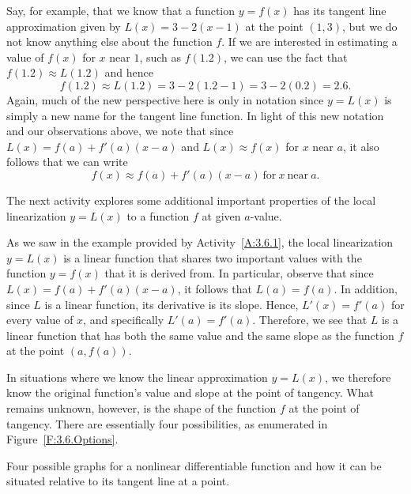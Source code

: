 Say, for example, that we know that a function $y = f(x)$ has its tangent line approximation given by $L(x) = 3 - 2(x-1)$ at the point $(1,3)$, but we do not know anything else about the function $f$.  If we are interested in estimating a value of $f(x)$ for $x$ near $1$, such as $f(1.2)$, we can use the fact that $f(1.2) \approx L(1.2)$ and hence
$$f(1.2) \approx L(1.2) = 3 - 2(1.2-1) = 3 - 2(0.2) = 2.6.$$
Again, much of the new perspective here is only in notation since $y = L(x)$ is simply a new name for the tangent line function.  In light of this new notation and our observations above, we note that since $L(x) = f(a) + f'(a)(x-a)$ and $L(x) \approx f(x)$ for $x$ near $a$, it also follows that we can write
$$f(x) \approx f(a) + f'(a)(x-a) \ \mbox{for} \  x \ \mbox{near} \ a.$$

The next activity explores some additional important properties of the local linearization $y = L(x)$ to a function $f$ at given $a$-value.


As we saw in the example provided by Activity~\ref{A:3.6.1}, the local linearization $y = L(x)$ is a linear function that shares two important values with the function $y = f(x)$ that it is derived from.  In particular, observe that since $L(x) = f(a) + f'(a)(x-a)$, it follows that $L(a) = f(a)$.  In addition, since $L$ is a linear function, its derivative is its slope.  Hence, $L'(x) = f'(a)$ for every value of $x$, and specifically $L'(a) = f'(a)$.  Therefore, we see that $L$ is a linear function that has both the same value and the same slope as the function $f$ at the point $(a,f(a))$.

In situations where we know the linear approximation $y = L(x)$, we therefore know the original function's value and slope at the point of tangency.  What remains unknown, however, is the shape of the function $f$ at the point of tangency.  There are essentially four possibilities, as enumerated in Figure~\ref{F:3.6.Options}.  

\begin{marginfigure}[1cm] %
\caption{Four possible graphs for a nonlinear differentiable function and how it can be situated relative to its tangent line at a point.} \label{F:3.6.Options}
\end{marginfigure}

